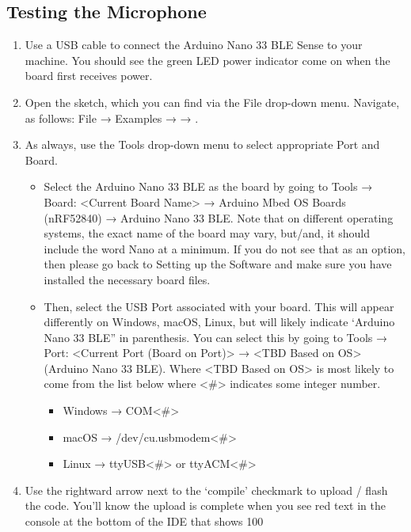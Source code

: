 \subsection{Testing the Microphone}

\begin{enumerate}
    \item Use a USB cable to connect the Arduino Nano 33 BLE Sense to your machine. You should see the green LED power indicator come on when the board first receives power.
  \item Open the  sketch, which you can find via the File drop-down menu. Navigate, as follows: File → Examples →  → .
  \item As always, use the Tools drop-down menu to select appropriate Port and Board.
  
  \begin{itemize}
    \item Select the Arduino Nano 33 BLE as the board by going to Tools → Board: <Current Board Name> → Arduino Mbed OS Boards (nRF52840) → Arduino Nano 33 BLE. Note that on different operating systems, the exact name of the board may vary, but/and, it should include the word Nano at a minimum. If you do not see that as an option, then please go back to Setting up the Software and make sure you have installed the necessary board files.
     \item Then, select the USB Port associated with your board. This will appear differently on Windows, macOS, Linux, but will likely indicate ‘Arduino Nano 33 BLE” in parenthesis. You can select this by going to Tools → Port: <Current Port (Board on Port)> → <TBD Based on OS> (Arduino Nano 33 BLE). Where <TBD Based on OS> is most likely to come from the list below where <\#> indicates some integer number.
       \begin{itemize}
           \item Windows → COM<\#>
           \item macOS → /dev/cu.usbmodem<\#>
           \item Linux → ttyUSB<\#> or ttyACM<\#>
       \end{itemize}
    \end{itemize}
  \item Use the rightward arrow next to the ‘compile’ checkmark to upload / flash the code.
You’ll know the upload is complete when you see red text in the console at the bottom of the IDE that shows 100%


\end{enumerate}
